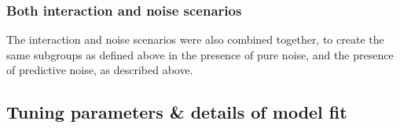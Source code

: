 \documentclass[12pt]{article}
\begin{document}


\subsubsection{Both interaction and noise scenarios} %
\label{ssub:subsubsection_name}

The interaction and noise scenarios were also combined together, to create the same subgroups as defined above in the presence of pure noise, and the presence of predictive noise, as described above.



\subsection{Tuning parameters \& details of model fit} %
\label{ssub:tuning_parameters_for_interaction_scenario}
\end{document}
